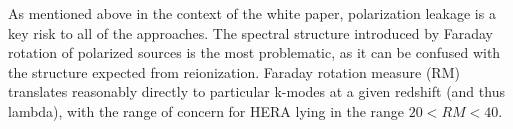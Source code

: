 \documentclass[preprint]{aastex}
\begin{document}
As mentioned above in the context of the white paper, polarization leakage is a key risk to all of the approaches.  
The spectral structure introduced by Faraday rotation of polarized sources is the most problematic, as it can be confused 
with the structure expected from reionization.  
Faraday rotation measure (RM) translates reasonably directly to particular k-modes at a given redshift (and thus lambda), with the range of concern for HERA lying in the range $20 < RM < 40$.
% 
% 
\end{document}
